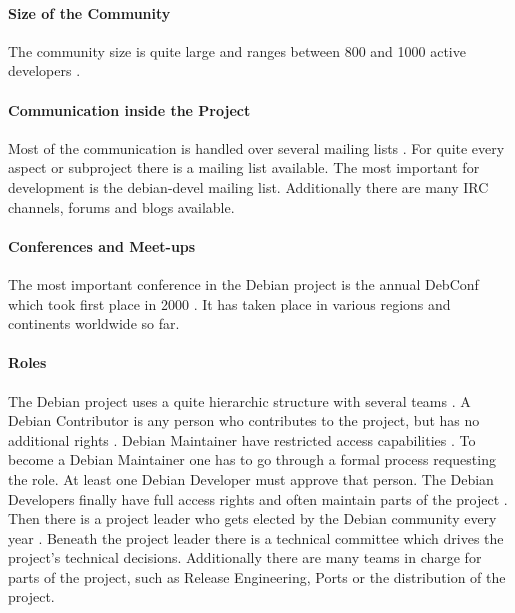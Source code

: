 \paragraph{Size of the Community}

The community size is quite large and ranges between 800 and 1000 active
developers \cite{Perrier2011,DebianOrg}.

\paragraph{Communication inside the Project}

Most of the communication is handled over several mailing lists
\cite{DebianMailingLists,DebianFAQ,DebianNewMembers}. For quite every aspect or
subproject there is a mailing list available. The most important for
development is the debian-devel mailing list. Additionally there are many
\ac{IRC} channels, forums and blogs available.

\paragraph{Conferences and Meet-ups}

The most important conference in the Debian project is the annual DebConf which
took first place in 2000 \cite{DebianDebConf}. It has taken place in various
regions and continents worldwide so far.

\paragraph{Roles}

The Debian project uses a quite hierarchic structure with several teams
\cite{DebianOrg,Sadowski2008}. A Debian Contributor is any person who
contributes to the project, but has no additional rights \cite{DebianFAQ}.
Debian Maintainer have restricted access capabilities \cite{DebianMaintainer}.
To become a Debian Maintainer one has to go through a formal process requesting
the role. At least one Debian Developer must approve that person. The Debian
Developers finally have full access rights and often maintain parts of the
project \cite{DebianDev}. Then there is a project leader who gets elected by
the Debian community every year \cite{DebianOrg,DebianVoting}. Beneath the
project leader there is a technical committee which drives the project's
technical decisions. Additionally there are many teams in charge for parts of
the project, such as Release Engineering, Ports or the distribution of the
project.

